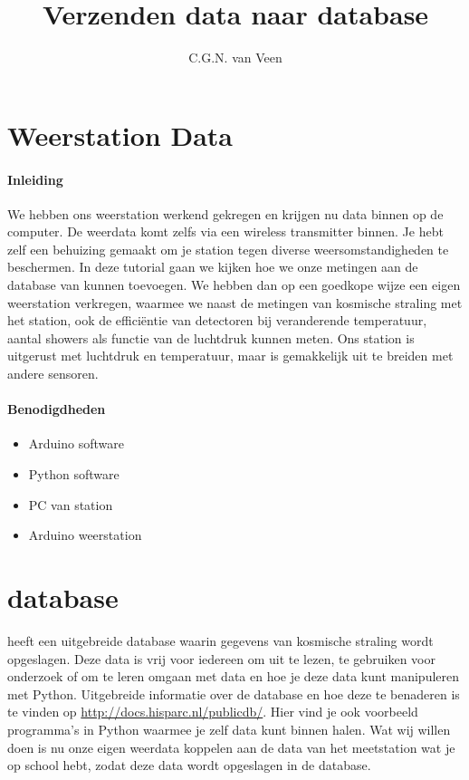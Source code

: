 

\title{Verzenden data naar \hisparc database}
\author{C.G.N. van Veen}



\maketitle

\section{Weerstation Data}

\paragraph{Inleiding} We hebben ons weerstation werkend gekregen en krijgen nu 
data binnen op de computer. De weerdata komt zelfs via een wireless
transmitter binnen. Je hebt zelf een behuizing gemaakt om je station
tegen diverse weersomstandigheden te beschermen. In deze tutorial gaan we kijken
hoe we onze metingen aan de database van \hisparc kunnen toevoegen. 
We hebben dan op een goedkope wijze een eigen weerstation verkregen, waarmee
we naast de metingen van kosmische straling met het \hisparc station, ook de
efficiëntie van detectoren bij veranderende temperatuur, aantal showers als functie van de 
luchtdruk kunnen meten. Ons station is uitgerust met luchtdruk en temperatuur,
maar is gemakkelijk uit te breiden met andere sensoren. 

\paragraph{Benodigdheden}

\begin{itemize}  
    \item Arduino software
    \item Python software
    \item PC van \hisparc station
    \item Arduino weerstation
    
\end{itemize}

\section{\hisparc database}

\hisparc heeft een uitgebreide database waarin gegevens van kosmische straling
wordt opgeslagen. Deze data is vrij voor iedereen om uit te lezen, te gebruiken
voor onderzoek of om te leren omgaan met data en hoe je deze data kunt manipuleren met Python.
Uitgebreide informatie over de \hisparc database en hoe deze te benaderen is te 
vinden op \url{http://docs.hisparc.nl/publicdb/}. Hier vind je ook voorbeeld
programma's in Python waarmee je zelf data kunt binnen halen.
Wat wij willen doen is nu onze eigen weerdata koppelen aan de data van het meetstation
wat je op school hebt, zodat deze data wordt opgeslagen in de \hisparc database.


